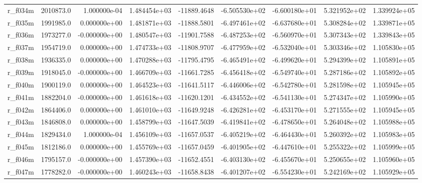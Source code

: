 \documentclass[10pt]{article}
\begin{document}
\begin{landscape}
\begin{longtable}{|l|r|r|r|r|r|r|r|r|}
r\_f034m                 &  2010873.0 &  1.000000e-04 &  1.484454e+03 & -11889.4648 & -6.505530e+02 & -6.600180e+01 &  5.321952e+02 &  1.339924e+05 \\
r\_f035m                 &  1991985.0 &  0.000000e+00 &  1.481871e+03 & -11888.5801 & -6.497461e+02 & -6.637680e+01 &  5.308284e+02 &  1.339871e+05 \\
r\_f036m                 &  1973277.0 & -0.000000e+00 &  1.480547e+03 & -11901.7588 & -6.487253e+02 & -6.560970e+01 &  5.307343e+02 &  1.339843e+05 \\
r\_f037m                 &  1954719.0 &  0.000000e+00 &  1.474733e+03 & -11808.9707 & -6.477959e+02 & -6.532040e+01 &  5.303346e+02 &  1.105830e+05 \\
r\_f038m                 &  1936335.0 &  0.000000e+00 &  1.470288e+03 & -11795.4795 & -6.465491e+02 & -6.499620e+01 &  5.294399e+02 &  1.105891e+05 \\
r\_f039m                 &  1918045.0 & -0.000000e+00 &  1.466709e+03 & -11661.7285 & -6.456418e+02 & -6.549740e+01 &  5.287186e+02 &  1.105892e+05 \\
r\_f040m                 &  1900119.0 &  0.000000e+00 &  1.464523e+03 & -11641.5117 & -6.446006e+02 & -6.542780e+01 &  5.281598e+02 &  1.105945e+05 \\
r\_f041m                 &  1882204.0 & -0.000000e+00 &  1.461618e+03 & -11620.1201 & -6.434552e+02 & -6.541130e+01 &  5.274347e+02 &  1.105990e+05 \\
r\_f042m                 &  1864406.0 &  0.000000e+00 &  1.461010e+03 & -11649.9248 & -6.426281e+02 & -6.453170e+01 &  5.271555e+02 &  1.105945e+05 \\
r\_f043m                 &  1846808.0 &  0.000000e+00 &  1.458799e+03 & -11647.5039 & -6.419841e+02 & -6.478650e+01 &  5.264048e+02 &  1.105988e+05 \\
r\_f044m                 &  1829434.0 &  1.000000e-04 &  1.456109e+03 & -11657.0537 & -6.405219e+02 & -6.464430e+01 &  5.260392e+02 &  1.105983e+05 \\
r\_f045m                 &  1812186.0 &  0.000000e+00 &  1.455769e+03 & -11657.0459 & -6.401905e+02 & -6.447610e+01 &  5.255322e+02 &  1.105999e+05 \\
r\_f046m                 &  1795157.0 & -0.000000e+00 &  1.457390e+03 & -11652.4551 & -6.403130e+02 & -6.455670e+01 &  5.250655e+02 &  1.105960e+05 \\
r\_f047m                 &  1778282.0 & -0.000000e+00 &  1.460243e+03 & -11658.8438 & -6.401207e+02 & -6.554230e+01 &  5.242169e+02 &  1.105929e+05 \\

\end{longtable}
\end{landscape}
\end{document}
